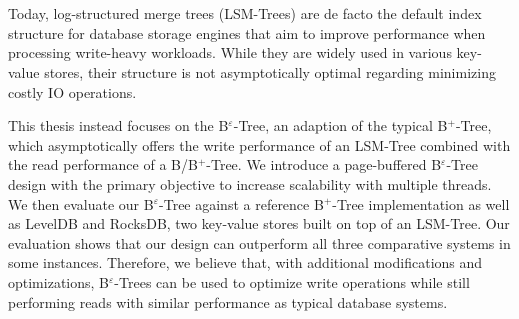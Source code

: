 \chapter{\abstractname}

Today, log-structured merge trees (LSM-Trees) are de facto the default index structure for database storage engines that aim to improve performance when processing write-heavy workloads. While they are widely used in various key-value stores, their structure is not asymptotically optimal regarding minimizing costly IO operations.

This thesis instead focuses on the B$^\varepsilon$-Tree, an adaption of the typical B$^+$-Tree, which asymptotically offers the write performance of an LSM-Tree combined with the read performance of a B/B$^+$-Tree. We introduce a page-buffered B$^\varepsilon$-Tree design with the primary objective to increase scalability with multiple threads. We then evaluate our B$^\varepsilon$-Tree against a reference B$^+$-Tree implementation as well as LevelDB and RocksDB, two key-value stores built on top of an LSM-Tree. Our evaluation shows that our design can outperform all three comparative systems in some instances. Therefore, we believe that, with additional modifications and optimizations, B$^\varepsilon$-Trees can be used to optimize write operations while still performing reads with similar performance as typical database systems.